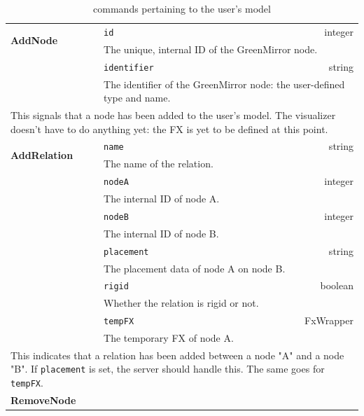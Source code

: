 \begin{longtable}{ |l|l r| }
\caption{commands pertaining to the user's model}\label{tab:commands_model}
\\\hline \multirow{2}{*}{\textbf{AddNode}}
   & \texttt{id} & integer 
\\ & \multicolumn{2}{|l|}{The unique, internal ID of the GreenMirror node.} 
\\ \cline{2-3} & \texttt{identifier} & string
\\ & \multicolumn{2}{|l|}{The identifier of the GreenMirror node: the user-defined type and name.}
\\ \cline{2-3} \multicolumn{3}{|l|}{\parbox[t]{14.1cm}{\vspace{5px} This signals that a node has been added to the user's model. The visualizer doesn't have to do anything yet: the FX is yet to be defined at this point. \vspace{10px}}}
\\ \hline\hline \multirow{2}{*}{\textbf{AddRelation}}
   & \texttt{name} & string 
\\ & \multicolumn{2}{|l|}{The name of the relation.} 
\\ \cline{2-3} & \texttt{nodeA} & integer
\\ & \multicolumn{2}{|l|}{The internal ID of node A.}
\\ \cline{2-3} & \texttt{nodeB} & integer
\\ & \multicolumn{2}{|l|}{The internal ID of node B.}
\\ \cline{2-3} & \texttt{placement} & string
\\ & \multicolumn{2}{|l|}{The placement data of node A on node B.}
\\ \cline{2-3} & \texttt{rigid} & boolean
\\ & \multicolumn{2}{|l|}{Whether the relation is rigid or not.}
\\ \cline{2-3} & \texttt{tempFX} & FxWrapper
\\ & \multicolumn{2}{|l|}{The temporary FX of node A.}
\\ \cline{2-3} \multicolumn{3}{|l|}{\parbox[t]{14.1cm}{\vspace{5px} This indicates that a relation has been added between a node "A" and a node "B". If \texttt{placement} is set, the server should handle this. The same goes for \texttt{tempFX}. \vspace{10px}}}
\\ \hline\hline \multirow{2}{*}{\textbf{RemoveNode}}

\end{longtable}
